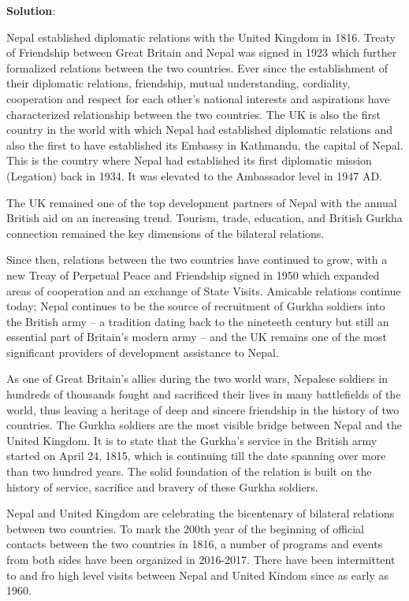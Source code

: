 \documentclass[
]{book}
\newenvironment{solution}{ {\bfseries Solution}:}{}
\begin{document}
\begin{solution}

Nepal established diplomatic relations with the United Kingdom in 1816. Treaty of Friendship between Great Britain and Nepal was signed in 1923 which further formalized relations between the two countries. Ever since the establishment of their diplomatic relations, friendship, mutual understanding, cordiality, cooperation and respect for each other's national interests and aspirations have characterized relationship between the two countries. The UK is also the first country in the world with which Nepal had established diplomatic relations and also the first to have established its Embassy in Kathmandu, the capital of Nepal. This is the country where Nepal had established its first diplomatic mission (Legation) back in 1934. It was elevated to the Ambassador level in 1947 AD.

The UK remained one of the top development partners of Nepal with the annual British aid on an increasing trend. Tourism, trade, education, and British Gurkha connection remained the key dimensions of the bilateral relations.

Since then, relations between the two countries have continued to grow, with a new Treay of Perpetual Peace and Friendship signed in 1950 which expanded areas of cooperation and an exchange of State Visits. Amicable relations continue today; Nepal continues to be the source of recruitment of Gurkha soldiers into the British army -- a tradition dating back to the nineteeth century but still an essential part of Britain's modern army -- and the UK remains one of the most significant providers of development assistance to Nepal.

As one of Great Britain's allies during the two world wars, Nepalese soldiers in hundreds of thousands fought and sacrificed their lives in many battlefields of the world, thus leaving a heritage of deep and sincere friendship in the history of two countries. The Gurkha soldiers are the most visible bridge between Nepal and the United Kingdom. It is to state that the Gurkha's service in the British army started on April 24, 1815, which is continuing till the date spanning over more than two hundred years. The solid foundation of the relation is built on the history of service, sacrifice and bravery of these Gurkha soldiers.

Nepal and United Kingdom are celebrating the bicentenary of bilateral relations between two countries. To mark the 200th year of the beginning of official contacts between the two countries in 1816, a number of programs and events from both sides have been organized in 2016-2017. There have been intermittent to and fro high level visits between Nepal and United Kindom since as early as 1960.


\end{solution}
\end{document}
